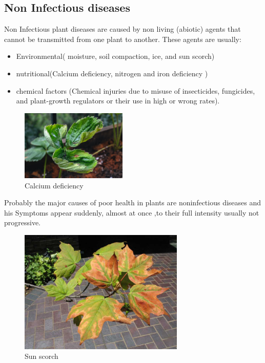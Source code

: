 \subsection{Non Infectious diseases }
Non Infectious  plant diseases are caused by non living (abiotic) agents that cannot be transmitted from one plant to another. \cite{book1} These agents are usually: 
\begin{itemize}
    \item Environmental( moisture, soil compaction, ice, and sun scorch)
    \item nutritional(Calcium deficiency, nitrogen and iron deficiency )
    \item chemical factors (Chemical injuries due to misuse of insecticides, fungicides, and plant-growth regulators or their use in high or wrong rates).
\end{itemize}
\begin{figure}[!h]
    \centering
    \includegraphics[width=0.45\textwidth]{chapters/chapter01/fig01/calcium_deficiency.jpeg}
    \caption{Calcium deficiency}
\end{figure}
\newpage
Probably the major causes of poor health in plants are noninfectious diseases and his Symptoms appear suddenly, almost at once ,to their full intensity usually not progressive.
\begin{figure}[!h]
    \centering
    \includegraphics[width=0.7\textwidth]{chapters/chapter01/fig01/Scorch.jpg}
    \caption{Sun scorch}
    \label{fig:my_label}
\end{figure}
